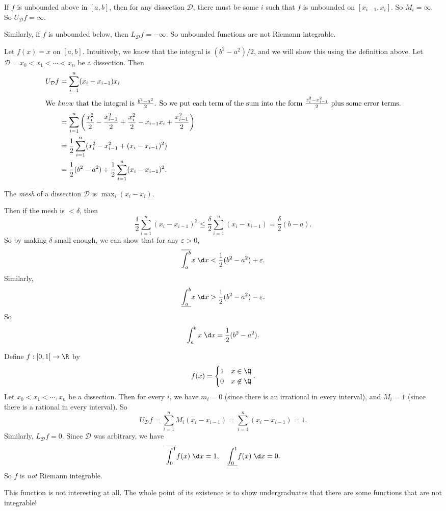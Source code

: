 \documentclass[a4paper]{article}
\begin{document}
\note If $f$ is unbounded above in $[a, b]$, then for any dissection $\mathcal{D}$, there must be some $i$ such that $f$ is unbounded on $[x_{i - 1}, x_i]$. So $M_i = \infty$. So $U_\mathcal{D} f = \infty$.

Similarly, if $f$ is unbounded below, then $L_{\mathcal{D}} f = -\infty$. So unbounded functions are not Riemann integrable.

\begin{eg}
  Let $f(x) = x$ on $[a, b]$. Intuitively, we know that the integral is $(b^2 - a^2)/2$, and we will show this using the definition above. Let $\mathcal{D} = x_0 < x_1 < \cdots < x_n$ be a dissection. Then
  \begin{align*}
    U_{\mathcal{D}}f &= \sum_{i = 1}^n (x_i - x_{i - 1})x_i\\
    \intertext{We \emph{know} that the integral is $\frac{b^2 - a^2}{2}$. So we put each term of the sum into the form $\frac{x_i^2 - x_{i - 1}^2}{2}$ plus some error terms.}
    &= \sum_{i = 1}^n \left(\frac{x_i^2}{2} - \frac{x_{i - 1}^2}{2} + \frac{x_i^2}{2} - x_{i - 1}x_i + \frac{x_{i - 1}^2}{2}\right)\\
    &= \frac{1}{2}\sum_{i = 1}^n (x_i^2 - x_{i - 1}^2 + (x_i - x_{i - 1})^2)\\
    &= \frac{1}{2}(b^2 - a^2) + \frac{1}{2}\sum_{i = 1}^n(x_i - x_{i - 1})^2.
  \end{align*}
  \begin{defi}[Mesh]
    The \emph{mesh} of a dissection $\mathcal{D}$ is $\max_i (x_i - x_i)$.
  \end{defi}
  Then if the mesh is $ < \delta$, then
    \[
      \frac{1}{2}\sum_{i = 1}^n (x_i - x_{i - 1})^2 \leq \frac{\delta}{2}\sum_{i = 1}^n (x_i - x_{i - 1}) = \frac{\delta}{2}(b - a).
    \]
  So by making $\delta$ small enough, we can show that for any $\varepsilon > 0$,
  \[
    \overline{\int_a^b} x\;\d x < \frac{1}{2}(b^2 - a^2) + \varepsilon.
  \]
  Similarly,
  \[
    \underline{\int_a^b} x\;\d x > \frac{1}{2}(b^2 - a^2) - \varepsilon.
  \]
  So
  \[
    \int_a^b x\;\d x = \frac{1}{2}(b^2 - a^2).
  \]
\end{eg}

\begin{eg}
  Define $f: [0, 1] \to \R$ by
  \[
    f(x) =
    \begin{cases}
      1 & x \in \Q\\
      0 & x \not\in \Q
    \end{cases}.
  \]
  Let $x_0 < x_1 < \cdots, x_n$ be a dissection. Then for every $i$, we have $m_i = 0$ (since there is an irrational in every interval), and $M_i = 1$ (since there is a rational in every interval). So
  \[
    U_{\mathcal{D}}f = \sum_{i = 1}^nM_i(x_i - x_{i - 1}) = \sum_{i = 1}^n (x_i - x_{i - 1}) = 1.
  \]
  Similarly, $L_\mathcal{D} f = 0$. Since $\mathcal{D}$ was arbitrary, we have
  \[
    \overline{\int_0^1}f(x)\;\d x = 1, \quad \underline{\int_0^1}f(x)\;\d x = 0.
  \]
  So $f$ is \emph{not} Riemann integrable.
\end{eg}
\note This function is not interesting at all. The whole point of its existence is to show undergraduates that there are some functions that are not integrable!
\end{document}
